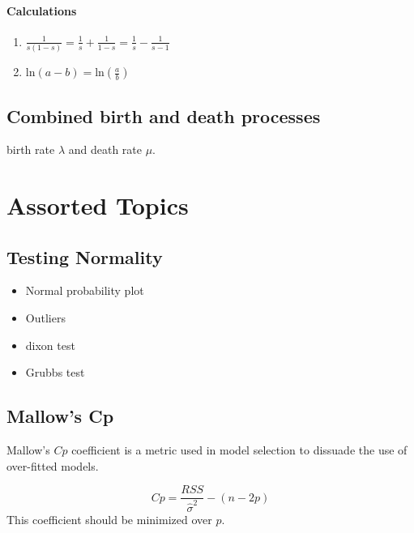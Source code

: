 \subsubsection{Calculations}
\begin{enumerate} \item  $ \frac{1}{s(1-s)} = \frac{1}{s} + \frac{1}{1-s} =
	\frac{1}{s} - \frac{1}{s-1}$
	\item $ \mbox{ln}(a-b) = \mbox{ln}(\frac{a}{b})$\\
\end{enumerate}

\section{Combined birth and death processes}
birth rate $\lambda$ and death rate $\mu$.


\newpage
\chapter{Assorted Topics}

\section{Testing Normality}

\begin{itemize}
	\item Normal probability plot \item Outliers \item dixon test
	\item Grubbs test
\end{itemize}


\section{Mallow's Cp}
Mallow's $Cp$ coefficient is a metric used in model selection to
dissuade the use of over-fitted models.

\begin{equation}
Cp= \frac{RSS}{\hat{\sigma}^{2}}-(n-2p)
\end{equation}
This coefficient should be minimized over $p$.

